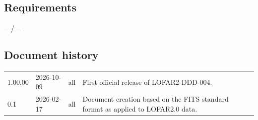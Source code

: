 \documentclass[a4paper,10pt,bibtotoc]{scrartcl}
\begin{document}
\subsection{Requirements}

---/---


\subsection{Document history}

\begin{center}
  \tablelasttail{\hline}
  \begin{supertabular}{lllp{10cm}}
    1.00.00 & 2026-10-09 & all & First official release of LOFAR2-DDD-004.\\
    0.1 & 2026-02-17 & all & Document creation based on the FITS standard format as applied to LOFAR2.0 data.\\
  \end{supertabular}

\end{center}

\end{document}
